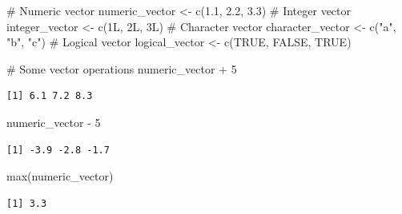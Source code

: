 \documentclass[
  letterpaper,
  DIV=11,
  numbers=noendperiod]{scrreprt}
\newenvironment{Shaded}{\begin{snugshade}}{\end{snugshade}}
\newcommand{\CommentTok}[1]{\textcolor[rgb]{0.37,0.37,0.37}{#1}}
\newcommand{\ConstantTok}[1]{\textcolor[rgb]{0.56,0.35,0.01}{#1}}
\newcommand{\DecValTok}[1]{\textcolor[rgb]{0.68,0.00,0.00}{#1}}
\newcommand{\FloatTok}[1]{\textcolor[rgb]{0.68,0.00,0.00}{#1}}
\newcommand{\FunctionTok}[1]{\textcolor[rgb]{0.28,0.35,0.67}{#1}}
\newcommand{\NormalTok}[1]{\textcolor[rgb]{0.00,0.23,0.31}{#1}}
\newcommand{\OtherTok}[1]{\textcolor[rgb]{0.00,0.23,0.31}{#1}}
\newcommand{\SpecialCharTok}[1]{\textcolor[rgb]{0.37,0.37,0.37}{#1}}
\newcommand{\StringTok}[1]{\textcolor[rgb]{0.13,0.47,0.30}{#1}}
\begin{document}
\begin{Shaded}
\begin{Highlighting}[]
\CommentTok{\# Numeric vector }
\NormalTok{numeric\_vector }\OtherTok{\textless{}{-}} \FunctionTok{c}\NormalTok{(}\FloatTok{1.1}\NormalTok{, }\FloatTok{2.2}\NormalTok{, }\FloatTok{3.3}\NormalTok{) }
\CommentTok{\# Integer vector }
\NormalTok{integer\_vector }\OtherTok{\textless{}{-}} \FunctionTok{c}\NormalTok{(}\DecValTok{1}\NormalTok{L, }\DecValTok{2}\NormalTok{L, }\DecValTok{3}\NormalTok{L) }
\CommentTok{\# Character vector }
\NormalTok{character\_vector }\OtherTok{\textless{}{-}} \FunctionTok{c}\NormalTok{(}\StringTok{"a"}\NormalTok{, }\StringTok{"b"}\NormalTok{, }\StringTok{"c"}\NormalTok{) }
\CommentTok{\# Logical vector }
\NormalTok{logical\_vector }\OtherTok{\textless{}{-}} \FunctionTok{c}\NormalTok{(}\ConstantTok{TRUE}\NormalTok{, }\ConstantTok{FALSE}\NormalTok{, }\ConstantTok{TRUE}\NormalTok{)}
\end{Highlighting}
\end{Shaded}

\begin{Shaded}
\begin{Highlighting}[]
\CommentTok{\# Some vector operations }
\NormalTok{numeric\_vector }\SpecialCharTok{+} \DecValTok{5}
\end{Highlighting}
\end{Shaded}

\begin{verbatim}
[1] 6.1 7.2 8.3
\end{verbatim}

\begin{Shaded}
\begin{Highlighting}[]
\NormalTok{numeric\_vector }\SpecialCharTok{{-}} \DecValTok{5}
\end{Highlighting}
\end{Shaded}

\begin{verbatim}
[1] -3.9 -2.8 -1.7
\end{verbatim}

\begin{Shaded}
\begin{Highlighting}[]
\FunctionTok{max}\NormalTok{(numeric\_vector)}
\end{Highlighting}
\end{Shaded}

\begin{verbatim}
[1] 3.3
\end{verbatim}
\end{document}
